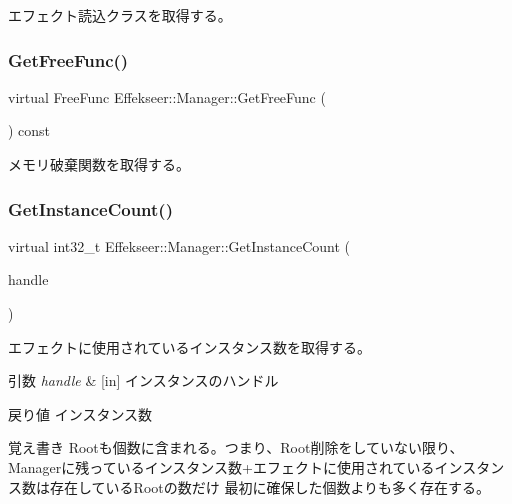 エフェクト読込クラスを取得する。 

\mbox{\label{class_effekseer_1_1_manager_a83bfa1c67a8d52a09a6fa5481e11697c}} 
\subsubsection{\texorpdfstring{Get\+Free\+Func()}{GetFreeFunc()}}
{\footnotesize\ttfamily virtual Free\+Func Effekseer\+::\+Manager\+::\+Get\+Free\+Func (\begin{DoxyParamCaption}{ }\end{DoxyParamCaption}) const\hspace{0.3cm}{\ttfamily [pure virtual]}}



メモリ破棄関数を取得する。 

\mbox{\label{class_effekseer_1_1_manager_a4e4831b6514c683cd9cabf5cfe1103ab}} 
\subsubsection{\texorpdfstring{Get\+Instance\+Count()}{GetInstanceCount()}}
{\footnotesize\ttfamily virtual int32\+\_\+t Effekseer\+::\+Manager\+::\+Get\+Instance\+Count (\begin{DoxyParamCaption}\item[{\mbox{\hyperlink{namespace_effekseer_afba58b8d812da862190e9bbfc040824a}{Handle}}}]{handle }\end{DoxyParamCaption})\hspace{0.3cm}{\ttfamily [pure virtual]}}



エフェクトに使用されているインスタンス数を取得する。 


\begin{DoxyParams}{引数}
{\em handle} & \mbox{[}in\mbox{]} インスタンスのハンドル \\
\hline
\end{DoxyParams}
\begin{DoxyReturn}{戻り値}
インスタンス数 
\end{DoxyReturn}
\begin{DoxyNote}{覚え書き}
Rootも個数に含まれる。つまり、\+Root削除をしていない限り、 Managerに残っているインスタンス数+エフェクトに使用されているインスタンス数は存在している\+Rootの数だけ 最初に確保した個数よりも多く存在する。 
\end{DoxyNote}
\mbox{\label{class_effekseer_1_1_manager_adef5e990faa38e39b9aa57f03f485747}} 
